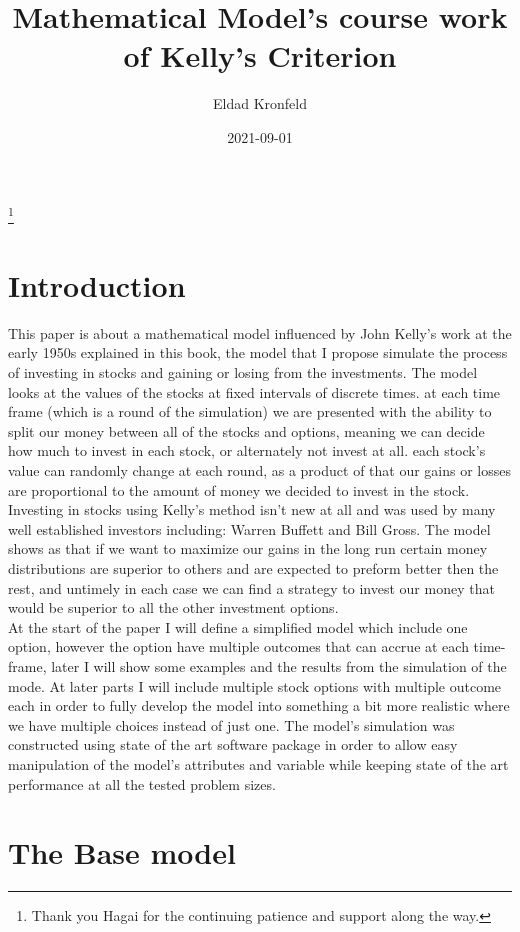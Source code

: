\documentclass{article}
\title{Mathematical Model's course work of Kelly's Criterion}
\date{2021-09-01}
\author{Eldad Kronfeld}
\begin{document}
	\maketitle
	\thanks{Thank you Hagai for the continuing patience and support along the way.}
	\tableofcontents
	\newpage
	\section{Introduction}
		This paper is about a mathematical model influenced by John Kelly's work\cite{6771227}  at the early 1950s explained in this book\cite{Finance}, 
		the model that I propose simulate the process of investing in stocks and gaining or losing from the investments.
		The model looks at the values of the stocks at fixed intervals of discrete times. at each time frame (which is a round of the simulation) we are presented with the ability to split our money between all of the stocks and options, meaning we can decide how much to invest in each stock, or alternately not invest at all. each stock's value can randomly change at each round, as a product of that our gains or losses are proportional to the amount of money we decided to invest in the stock.\\
		Investing in stocks using Kelly's method isn't new at all and was used by many well established investors including:
		Warren Buffett\cite{buffet} and Bill Gross\cite{wiki}.
		The model shows as that if we want to maximize our gains in the long run certain money distributions are superior to others and are expected to preform better then the rest, and untimely in each case we can find a strategy to invest our money that would be superior to all the other investment options.\\
		At the start of the paper I will define a simplified model which include one option, however the option have multiple outcomes that can accrue at each time-frame, later I will show some examples and the results from the simulation of the mode.
		At later parts I will include multiple stock options with multiple outcome each in order to fully develop the model into something a bit more realistic where we have multiple choices instead of just one.
		The model's simulation was constructed using state of the art software package in order to allow easy manipulation of the model's attributes and variable while keeping state of the art performance at all the tested problem sizes.
	\section{The Base model}
\end{document}

